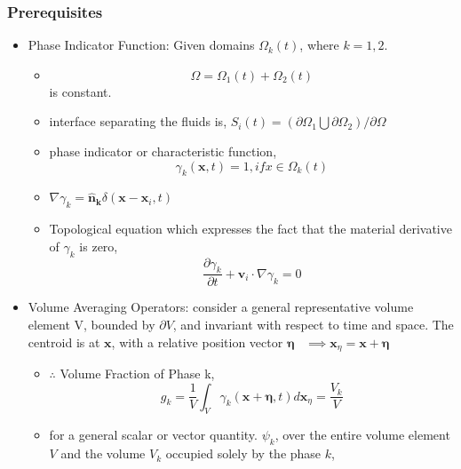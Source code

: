 \subsubsection{Prerequisites}
\begin{itemize}
	\item Phase Indicator Function: Given domains $\Omega_{k}(t)$, where $k=1,2$.
		\begin{itemize}
		\item \begin{equation}
				\Omega = \Omega_{1}(t) + \Omega_{2}(t) \end{equation} is constant.
		\item interface separating the fluids is, $S_{i}(t) = (\partial \Omega_{1} \bigcup \partial \Omega_{2}) / \partial \Omega$
		\item phase indicator or characteristic function,
			\begin{equation}
					\gamma_{k}(\mathbf{x}, t) = 1, if x \in \Omega_{k}(t)
			\end{equation}
		\item \begin{math} \nabla \gamma_{k} = \mathbf{\hat{n}_k} \delta (\mathbf{x} - \mathbf{x}_{i}, t) \end{math}
		\item Topological equation which expresses the fact that the material derivative of $\gamma_{k}$ is zero, 
			\begin{equation}
				\frac{\partial \gamma_{k}}{\partial t} + \mathbf{v}_{i} \cdot \nabla \gamma_{k} = 0
			\end{equation}
		\end{itemize}
	\item Volume Averaging Operators: consider a general representative volume element V, bounded by $\partial V$, and invariant with respect to time and space. The centroid is at $\mathbf{x}$, with a relative position vector $\mathbf{\eta}$~\newline
			$\implies \mathbf{x}_{\eta} = \mathbf{x} + \mathbf{\eta}$
			\begin{itemize}
				\item $ \therefore$ Volume Fraction of Phase k,~\newline
						\begin{equation}
							g_{k} = \frac{1}{V} \int_{V} \gamma_{k}(\mathbf{x} + \mathbf{\eta}, t) d\mathbf{x}_{\eta} = \frac{V_{k}}{V}
						\end{equation}
				\item for a general scalar or vector quantity. $\psi_{k}$, over the entire volume element $V$ and the volume $V_{k}$ occupied solely by the phase $k$,~\newline

\end{itemize}
\end{itemize}
